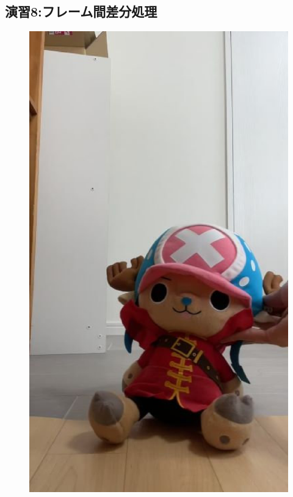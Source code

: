﻿\documentclass[a4j,11pt]{jarticle}
\begin{document}
\subsection{演習8:フレーム間差分処理}
\clearpage
\begin{figure}[tb]



 \begin{minipage}{0.49\hsize} %
   \center
   \includegraphics[width=0.6\hsize]{./eps/frame-thopper1.eps}
 \end{minipage}
 \begin{minipage}{0.49\hsize} %
   \center

\end{minipage}
\end{figure}
\end{document}

